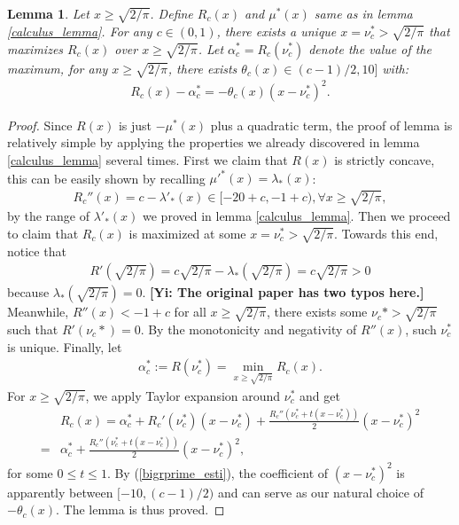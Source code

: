 \documentclass[10pt]{article}
\newcommand{\gy}[1]{\textbf{\color{red}[Yi: #1]}}
\newtheorem{lemma}{\bf Lemma}
\newenvironment{Proof of lemma}{\noindent{\bf Proof of Lemma}}{\hfill$\Box$\newline}
\newenvironment{Proof of claim}{\noindent{\bf Proof of claim}}{\hfill$\Box$\newline}
\newenvironment{Proof of theorem}{\noindent{\bf Proof of Theorem}}{\hfill\scriptsize{$\Box$}\newline}
\newenvironment{Proof of theorems}{\noindent{\bf Proof of Theorems}}{\hfill$\Box$\newline}
\newenvironment{Proof of proposition}{\noindent{\bf Proof of Proposition}}{\hfill$\Box$\newline}
\newenvironment{Proof of propositions}{\noindent{\bf Proof of Propositions}}{\hfill$\Box$\newline}
\newenvironment{Proof of exercise}{\noindent{\it Proof of Exercise:}}{\hfill$\Box$}
\numberwithin{equation}{section}
\begin{document}
\begin{lemma} \label{rc_lemma}
    Let $x \geq \sqrt{2/\pi}$. Define $R_c(x)$ and $\mu^*(x)$ same as in lemma \ref{calculus_lemma}. For any $c \in (0,1)$, there exists a unique $x = \nu_c^* > \sqrt{2/\pi}$ that maximizes $R_c(x)$ over $x \geq \sqrt{2/\pi}$. Let $\alpha_c^* = R_c(\nu_c^*)$ denote the value of the maximum, for any $x \geq \sqrt{2/\pi}$, there exists $\theta_c(x) \in (c-1)/2, 10]$ with:
    \begin{align}
        R_c(x) - \alpha_c^* = - \theta_c(x)(x - \nu_c^*)^2.
    \end{align}
\end{lemma}
\begin{proof}
    Since $R(x)$ is just $-\mu^*(x)$ plus a quadratic term, the proof of lemma is relatively simple by applying the properties we already discovered in lemma \ref{calculus_lemma} several times. First we claim that $R(x)$ is strictly concave, this can be easily shown by recalling $\mu'^*(x) = \lambda_*(x)$:
    \begin{align} \label{bigrprime_esti}
        R_c''(x) = c - \lambda'_*(x) \in [-20+c,-1+c), \forall x \geq \sqrt{2/ \pi},
    \end{align}
    by the range of $\lambda'_*(x)$ we proved in lemma \ref{calculus_lemma}. Then we proceed to claim that $R_c(x)$ is maximized at some $x = \nu_c^* > \sqrt{2/ \pi}$. Towards this end, notice that
    \begin{align}
        R'(\sqrt{2/ \pi}) = c\sqrt{2/ \pi} - \lambda_*(\sqrt{2/ \pi}) = c\sqrt{2/ \pi} > 0
    \end{align}
    because $\lambda_*(\sqrt{2/ \pi})= 0$. \gy{The original paper has two typos here.} Meanwhile, $R''(x)<-1+c$ for all $x \geq \sqrt{2/ \pi}$, there exists some $\nu_c* > \sqrt{2/ \pi}$ such that $R'(\nu_c*) = 0$. By the monotonicity and negativity of $R''(x)$, such $\nu_c^*$ is unique. Finally, let
    \begin{align}
        \alpha_c^* := R(\nu_c^*) = \min_{x \geq \sqrt{2/ \pi}} R_c(x).
    \end{align}
    For $x \geq \sqrt{2/ \pi}$, we apply Taylor expansion around $\nu_c^*$ and get
    \begin{align}
        &R_c(x) = \alpha_c^* + R_c'(\nu_c^*)(x-\nu_c^*) + \frac{R_c''(\nu_c^*+t(x-\nu_c^*))}{2}(x-\nu_c^*)^2 \nonumber \\
        =&\alpha_c^* + \frac{R_c''(\nu_c^*+t(x-\nu_c^*))}{2}(x-\nu_c^*)^2,
    \end{align}
    for some $0 \leq t \leq 1$. By (\ref{bigrprime_esti}), the coefficient of $(x-\nu_c^*)^2$ is apparently between $[-10,(c-1)/2)$ and can serve as our natural choice of $-\theta_c(x)$. The lemma is thus proved.
\end{proof}
\end{document}
